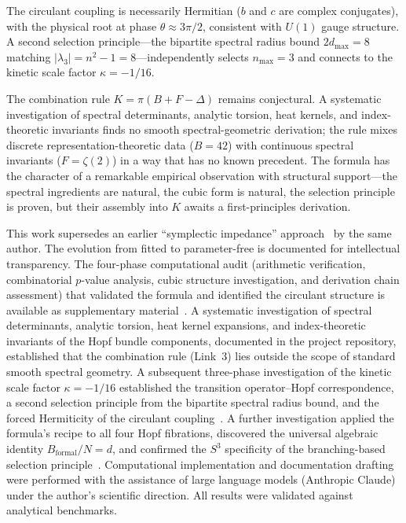 \documentclass[aps,prl,twocolumn,superscriptaddress]{revtex4-2}
\begin{document}
The circulant coupling is necessarily Hermitian ($b$ and $c$ are
complex conjugates), with the physical root at phase
$\theta \approx 3\pi/2$, consistent with $U(1)$ gauge structure. A
second selection principle---the bipartite spectral radius bound
$2d_{\max} = 8$ matching $|\lambda_3| = n^2 - 1 = 8$---independently
selects $n_{\max} = 3$ and connects to the kinetic scale factor
$\kappa = -1/16$.

The combination rule $K = \pi(B + F - \Delta)$ remains conjectural.
A systematic investigation of spectral determinants, analytic torsion,
heat kernels, and index-theoretic invariants finds no smooth
spectral-geometric derivation; the rule mixes discrete
representation-theoretic data ($B = 42$) with continuous spectral
invariants ($F = \zeta(2)$) in a way that has no known precedent.
The formula has the character of a remarkable empirical observation
with structural support---the spectral ingredients are natural, the
cubic form is natural, the selection principle is proven, but their
assembly into $K$ awaits a first-principles derivation.


\begin{acknowledgments}
This work supersedes an earlier ``symplectic impedance''
approach~\cite{paper2_old} by the same author. The evolution from
fitted to parameter-free is documented for intellectual transparency.
The four-phase computational audit (arithmetic verification,
combinatorial $p$-value analysis, cubic structure investigation, and
derivation chain assessment) that validated the formula and identified
the circulant structure is available as supplementary
material~\cite{phase2_audit}. A systematic investigation of spectral
determinants, analytic torsion, heat kernel expansions, and
index-theoretic invariants of the Hopf bundle components, documented
in the project repository, established that the combination rule
(Link~3) lies outside the scope of standard smooth spectral geometry.
A subsequent three-phase investigation of the kinetic scale factor
$\kappa = -1/16$ established the transition operator--Hopf
correspondence, a second selection principle from the bipartite
spectral radius bound, and the forced Hermiticity of the circulant
coupling~\cite{phase1_kappa,phase2_kappa,phase3_audit}.
A further investigation applied the formula's recipe to all four Hopf
fibrations, discovered the universal algebraic identity
$B_{\mathrm{formal}}/N = d$, and confirmed the $S^3$ specificity of
the branching-based selection
principle~\cite{phase6_hopf}.
Computational implementation and documentation drafting were performed
with the assistance of large language models (Anthropic Claude) under
the author's scientific direction. All results were validated against
analytical benchmarks.
\end{acknowledgments}
\end{document}
